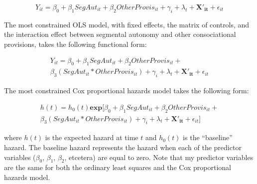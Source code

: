 \documentclass[12pt]{article}
\begin{document}
\begin{equation}
Y_{it} = \beta_0 + \beta_1 SegAut_{it} + \beta_2 OtherProvis_{it} + \gamma_i + \lambda_t + \mathbf{X'_{it}} + \epsilon_{it}
\end{equation}

The most constrained OLS model, with fixed effects, the matrix of controls, and the interaction effect between segmental autonomy and other consociational provisions, takes the following functional form: 

\begin{equation}
\begin{gathered}
Y_{it} = \beta_0 + \beta_1 SegAut_{it} + \beta_2 OtherProvis_{it} + \\ \beta_3 (SegAut_{it} * OtherProvis_{it})  + \gamma_i + \lambda_t + \mathbf{X'_{it}} + \epsilon_{it}
\end{gathered}
\end{equation}

The most constrained Cox proportional hazards model takes the following form: 

\begin{equation}
\begin{gathered}
h(t) = h_0 (t)\mathbf{exp}[\beta_0 + \beta_1 SegAut_{it} + \beta_2 OtherProvis_{it} + \\ \beta_3 (SegAut_{it} * OtherProvis_{it})  + \gamma_i + \lambda_t + \mathbf{X'_{it}} + \epsilon_{it}]
\end{gathered}
\end{equation}

where $h(t)$ is the expected hazard at time $t$ and $h_0 (t)$ is the ``baseline'' hazard. The baseline hazard represents the hazard when each of the predictor variables ($\beta_0$, $\beta_1$, $\beta_2$, etcetera) are equal to zero. Note that my predictor variables are the same for both the ordinary least squares and the Cox proportional hazards model. 
\end{document}
